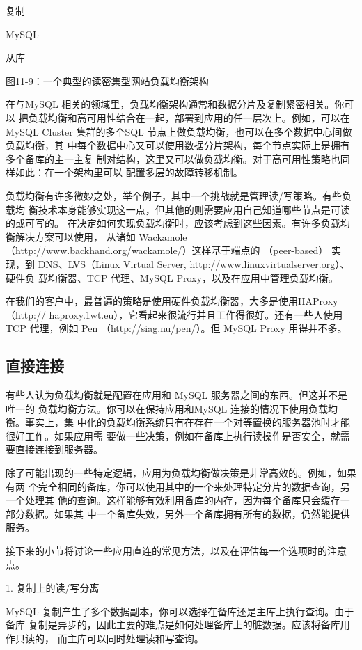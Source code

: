 复制

MySQL

从库

图11-9：一个典型的读密集型网站负载均衡架构

在与MySQL 相关的领域里，负载均衡架构通常和数据分片及复制紧密相关。你可以
把负载均衡和高可用性结合在一起，部署到应用的任一层次上。例如，可以在 MySQL
Cluster 集群的多个SQL 节点上做负载均衡，也可以在多个数据中心间做负载均衡，其
中每个数据中心又可以使用数据分片架构，每个节点实际上是拥有多个备库的主一主复
制对结构，这里又可以做负载均衡。对于高可用性策略也同样如此：在一个架构里可以
配置多层的故障转移机制。

负载均衡有许多微妙之处，举个例子，其中一个挑战就是管理读/写策略。有些负载均
衡技术本身能够实现这一点，但其他的则需要应用自己知道哪些节点是可读的或可写的。
在决定如何实现负载均衡时，应该考虑到这些因素。有许多负载均衡解决方案可以使用，
从诸如 Wackamole （http://www.backhand.org/wackamole/）这样基于端点的 （peer-based）
实现，到 DNS、LVS（Linux Virtual Server, http://www.linuxvirtualserver.org）、硬件负
载均衡器、TCP 代理、MySQL Proxy，以及在应用中管理负载均衡。

在我们的客户中，最普遍的策略是使用硬件负载均衡器，大多是使用HAProxy （http://
haproxy.1wt.eu），它看起来很流行并且工作得很好。还有一些人使用TCP 代理，例如
Pen （http://siag.nu/pen/）。但 MySQL Proxy 用得并不多。

\subsection{直接连接}
有些人认为负载均衡就是配置在应用和 MySQL 服务器之间的东西。但这并不是唯一的
负载均衡方法。你可以在保持应用和MySQL 连接的情况下使用负载均衡。事实上，集
中化的负载均衡系统只有在存在一个对等置换的服务器池时才能很好工作。如果应用需
要做一些决策，例如在备库上执行读操作是否安全，就需要直接连接到服务器。

除了可能出现的一些特定逻辑，应用为负载均衡做决策是非常高效的。例如，如果有两
个完全相同的备库，你可以使用其中的一个来处理特定分片的数据查询，另一个处理其
他的查询。这样能够有效利用备库的内存，因为每个备库只会缓存一部分数据。如果其
中一个备库失效，另外一个备库拥有所有的数据，仍然能提供服务。

接下来的小节将讨论一些应用直连的常见方法，以及在评估每一个选项时的注意点。

1. 复制上的读/写分离

MySQL 复制产生了多个数据副本，你可以选择在备库还是主库上执行查询。由于备库
复制是异步的，因此主要的难点是如何处理备库上的脏数据。应该将备库用作只读的，
而主库可以同时处理读和写查询。


